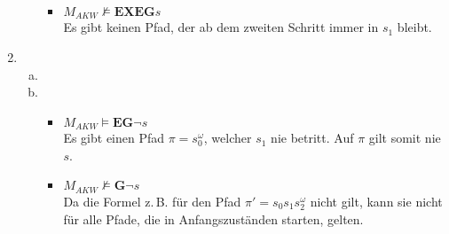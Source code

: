\documentclass[a4paper]{scrartcl}
\begin{document}
\begin{enumerate}
\begin{enumerate}[(a)]
\begin{itemize}
                    \item $M_{AKW} \not\models \textbf{EXEG}s$ \\
                        Es gibt keinen Pfad, der ab dem zweiten Schritt immer
                        in $s_1$ bleibt.

                \end{itemize}
                
        \end{enumerate}

    \item
        \begin{enumerate}[(a)]
            \item
                
            \item
                \begin{itemize}
                    \item $M_{AKW} \models \textbf{EG}\lnot s$ \\
                        Es gibt einen Pfad $\pi = s_0^\omega$, welcher $s_1$
                        nie betritt.
                        Auf $\pi$ gilt somit nie $s$.

                    \item $M_{AKW} \not\models \textbf{G}\lnot s$ \\
                        Da die Formel z.\,B. für den Pfad
                        $\pi' = s_0s_1s_2^\omega$ nicht gilt, kann sie nicht für
                        alle Pfade, die in Anfangszuständen starten, gelten.

                \end{itemize}
                
        \end{enumerate}

\end{enumerate}
\end{document}
